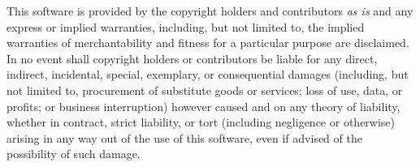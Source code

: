 This software is provided by the copyright holders and contributors \textit{as is} and any express or implied warranties, including, but not limited to, the implied warranties of merchantability and fitness for a particular purpose are disclaimed. In no event shall copyright holders or contributors be liable for any direct, indirect, incidental, special, exemplary, or consequential damages (including, but not limited to, procurement of substitute goods or services; loss of use, data, or profits; or business interruption) however caused and on any theory of liability, whether in contract, strict liability, or tort (including negligence or otherwise) arising in any way out of the use of this software, even if advised of the possibility of such damage.